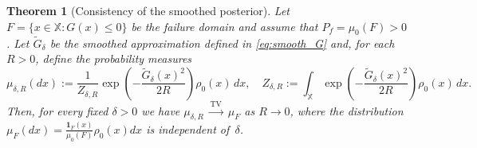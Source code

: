 \documentclass[10pt,a4paper]{amsart}
\newtheorem{theorem}{Theorem}
\begin{document}
\begin{theorem}[Consistency of the smoothed posterior]
\label{thm:consistency}
Let $F=\{x\in\mathbb X : G(x)\le 0\}$ be the failure domain and assume that $P_f=\mu_0(F)>0$. Let $\tilde G_\delta$ be the smoothed approximation defined in
\eqref{eq:smooth_G} and, for each $R>0$, define the probability measures
\begin{equation}\label{eq:smoothedpost}
  \mu_{\delta,R}(dx)
  := \frac{1}{Z_{\delta,R}}
     \exp\!\left(-\frac{\tilde G_\delta(x)^2}{2R}\right)\rho_0(x)\,dx,
  \quad  
  Z_{\delta,R}
  := \int_{\mathbb X} \exp\!\left(-\frac{\tilde G_\delta(x)^2}{2R}\right)
      \rho_0(x)\,dx.
\end{equation}
Then, for every fixed $\delta>0$ we have $\mu_{\delta,R}\;\xrightarrow{\mathrm{TV}}\;\mu_F$ as $R\rightarrow 0 $,
where the distribution $\mu_F(dx)=\frac{\mathbf{1}_F(x)}{\mu_0(F)}\rho_0(x)dx$ is independent of~$\delta$. 
\end{theorem}
\end{document}
